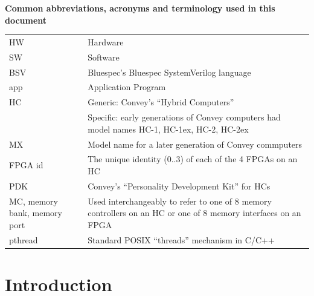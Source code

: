 \documentclass[twoside,letterpaper,11pt]{article}
\newcommand{\hm}{\hspace*{1em}}
\newcommand{\hmm}{\hspace*{2em}}
\begin{document}
\newpage

\clearpage
{}
{}

\tableofcontents


\vfill

\hm

\pagebreak


\begin{center}
{\bf Common abbreviations, acronyms and terminology used in this document}

\begin{tabular}{|p{1.3in}|p{4.8in}|}
\hline
HW  & Hardware \\
SW  &  Software \\
BSV  & Bluespec's Bluespec SystemVerilog language \\
app  & Application Program \\
HC  & Generic: Convey's ``Hybrid Computers'' \\
    & Specific: early generations of Convey computers had model names HC-1, HC-1ex, HC-2, HC-2ex \\
MX  & Model name for a later generation of Convey commputers \\
FPGA id & The unique identity (0..3) of each of the 4 FPGAs on an HC \\
PDK & Convey's ``Personality Development Kit'' for HCs \\
MC, memory bank, \hmm memory port & Used interchangeably to refer to one of
8 memory controllers on an HC or one of 8 memory interfaces on an FPGA \\
pthread & Standard POSIX ``threads'' mechanism in C/C++ \\
\hline
\end{tabular}
\end{center}

\vspace{2cm}

\section{Introduction}
\end{document}
